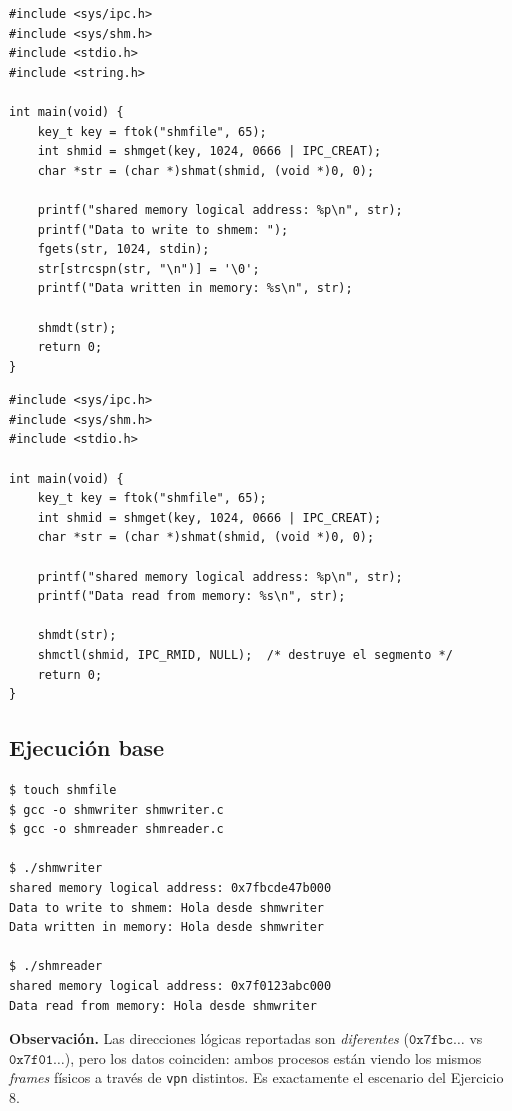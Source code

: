 \documentclass[11pt,a4paper]{article}
\begin{document}
\begin{lstlisting}[style=cstyle,caption={shmwriter.c}]
#include <sys/ipc.h>
#include <sys/shm.h>
#include <stdio.h>
#include <string.h>

int main(void) {
    key_t key = ftok("shmfile", 65);
    int shmid = shmget(key, 1024, 0666 | IPC_CREAT);
    char *str = (char *)shmat(shmid, (void *)0, 0);

    printf("shared memory logical address: %p\n", str);
    printf("Data to write to shmem: ");
    fgets(str, 1024, stdin);
    str[strcspn(str, "\n")] = '\0';
    printf("Data written in memory: %s\n", str);

    shmdt(str);
    return 0;
}
\end{lstlisting}

\begin{lstlisting}[style=cstyle,caption={shmreader.c}]
#include <sys/ipc.h>
#include <sys/shm.h>
#include <stdio.h>

int main(void) {
    key_t key = ftok("shmfile", 65);
    int shmid = shmget(key, 1024, 0666 | IPC_CREAT);
    char *str = (char *)shmat(shmid, (void *)0, 0);

    printf("shared memory logical address: %p\n", str);
    printf("Data read from memory: %s\n", str);

    shmdt(str);
    shmctl(shmid, IPC_RMID, NULL);  /* destruye el segmento */
    return 0;
}
\end{lstlisting}

\subsection{Ejecución base}

\begin{lstlisting}[style=shellstyle]
$ touch shmfile
$ gcc -o shmwriter shmwriter.c
$ gcc -o shmreader shmreader.c

$ ./shmwriter
shared memory logical address: 0x7fbcde47b000
Data to write to shmem: Hola desde shmwriter
Data written in memory: Hola desde shmwriter

$ ./shmreader
shared memory logical address: 0x7f0123abc000
Data read from memory: Hola desde shmwriter
\end{lstlisting}

\textbf{Observación.} Las direcciones lógicas reportadas son
\emph{diferentes} ($\texttt{0x7fbc\ldots}$ vs $\texttt{0x7f01\ldots}$),
pero los datos coinciden: ambos procesos están viendo los mismos
\emph{frames} físicos a través de \texttt{vpn} distintos. Es
exactamente el escenario del Ejercicio 8.
\end{document}
